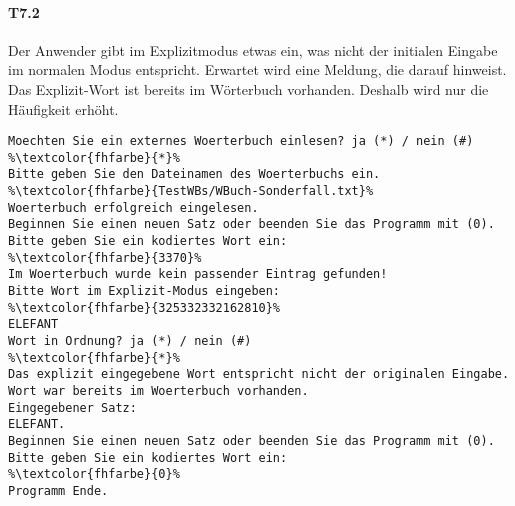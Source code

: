 \paragraph*{T7.2} Der Anwender gibt im Explizitmodus etwas ein, was nicht der initialen Eingabe im normalen Modus entspricht.
Erwartet wird eine Meldung, die darauf hinweist.
Das Explizit-Wort ist bereits im Wörterbuch vorhanden.
Deshalb wird nur die Häufigkeit erhöht.
\begin{center}
    \label{fig:wbuch7}
\end{center}

\begin{lstlisting}[escapechar=\%]
Moechten Sie ein externes Woerterbuch einlesen? ja (*) / nein (#)
%\textcolor{fhfarbe}{*}%
Bitte geben Sie den Dateinamen des Woerterbuchs ein.
%\textcolor{fhfarbe}{TestWBs/WBuch-Sonderfall.txt}%
Woerterbuch erfolgreich eingelesen.
Beginnen Sie einen neuen Satz oder beenden Sie das Programm mit (0).
Bitte geben Sie ein kodiertes Wort ein:
%\textcolor{fhfarbe}{3370}%
Im Woerterbuch wurde kein passender Eintrag gefunden!
Bitte Wort im Explizit-Modus eingeben:
%\textcolor{fhfarbe}{325332332162810}%
ELEFANT
Wort in Ordnung? ja (*) / nein (#)
%\textcolor{fhfarbe}{*}%
Das explizit eingegebene Wort entspricht nicht der originalen Eingabe.
Wort war bereits im Woerterbuch vorhanden.
Eingegebener Satz:
ELEFANT.
Beginnen Sie einen neuen Satz oder beenden Sie das Programm mit (0).
Bitte geben Sie ein kodiertes Wort ein:
%\textcolor{fhfarbe}{0}%
Programm Ende.
\end{lstlisting}

\begin{center}
    \label{fig:wbuch8}
\end{center}